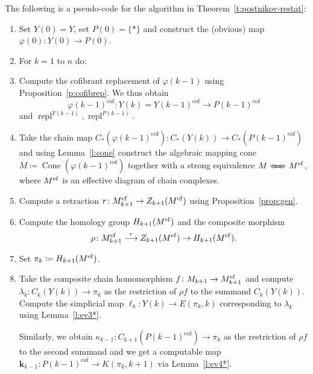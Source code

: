 \documentclass[12pt,a4wide]{article}
\theoremstyle{plain}
\theoremstyle{definition}
\newcommand{\cofr}{\mathrm{cof}}
\newcommand{\repl}{\mathop\mathrm{repl}}
\newcommand{\Pst}[1]{P(#1)}
\newcommand{\Yst}[1]{Y(#1)}
\newcommand{\towercompmap}[2]{#1(#2)}
\newcommand{\varphist}[1]{\towercompmap{\varphi}{#1}}
\newcommand{\thedim}{{n}}
\newcommand{\thedimm}{{k}}
\renewcommand\:{\colon}
\newcommand{\dY}{Y}
\newcommand{\dM}{M}
\newcommand{\dpi}{\pi}
\newcommand{\dK}{K}
\newcommand{\dE}{E}
\newcommand{\dC}{{C}}
\newcommand{\dZ}{Z}
\newcommand{\dH}{H}
\newcommand\kkk{{\mathbf{k}}}
\newcommand{\steq}{\Leftarrow\!\!\!\!\Leftarrow\!\!\!\!\Rightarrow\!\!\!\!\Rightarrow}
\DeclareMathOperator\dCone{{Cone}}
\begin{document}
The following is a pseudo-code for the algorithm in Theorem~\ref{t:postnikov-restat}:

\begin{enumerate}
[topsep=2pt,labelsep=1em,labelindent=0.5em,leftmargin=*,label=\textbf{(\arabic*)},align=left]
\item\label{bas:s} Set $\Yst{0} = \dY$, set $\Pst{0} = \{ * \}$  and construct the (obvious) map $\varphist{0}\: \Yst{0} \to\Pst{0}$.
\item For $\thedimm = 1$ to $\thedim$ do:
\item\label{iter:f} Compute the cofibrant replacement of $\varphist{\thedimm -1}$ using Proposition~\ref{p:cofibrep}. We thus obtain
\[
\varphist{\thedimm -1}^\cofr\: \Yst{\thedimm}  = \Yst{\thedimm -1} ^\cofr \longrightarrow \Pst{\thedimm -1}^\cofr
\]
and $\repl^{\Yst{\thedimm -1}}, \repl^{\Pst{\thedimm -1}}$.


\item\label{iter:s} Take the chain map $C_* (\varphist{\thedimm-1}^\cofr)\:\dC_*(\Yst{\thedimm})\to \dC_*(\Pst{\thedimm-1}^\cofr)$ and using Lemma~\ref{l:cone} construct the algebraic mapping cone $\dM\coloneqq\dCone(\varphist{\thedimm-1}^\cofr)$ together with a strong equivalence $\dM \steq \dM^\ef$, where $\dM^\ef$ is an effective diagram of chain complexes.
\item\label{step:retraction} Compute a retraction $r\: \dM^\ef _{\thedimm+1} \to \dZ_{\thedimm+1}  (\dM^\ef)$ using Proposition~\ref{prop:gen}. 
\item Compute the homology group $\dH_{\thedimm+1}(\dM^\ef)$ and the composite morphism \[\rho\:\dM^\ef _{\thedimm+1}\stackrel{r}{\longrightarrow}\dZ_{\thedimm+1}  (\dM^\ef) \to \dH_{\thedimm+1}(\dM^\ef).\]
\item Set $\dpi_\thedimm \coloneqq \dH_{\thedimm+1}(\dM^\ef)$.
\item Take the composite chain homomorphism $f\:{\dM}_{\thedimm+1} \to {\dM}_{\thedimm+1}^\ef$ and compute $\lambda_\thedimm\:\dC_\thedimm(\Yst{\thedimm})\to \dpi_\thedimm$ as the restriction of $\rho f$ to the summand $\dC_\thedimm(\Yst{\thedimm})$. Compute the simplicial map $\ell_\thedimm:\Yst{\thedimm} \to \dE(\dpi_\thedimm,\thedimm)$  corresponding to $\lambda_\thedimm$ using Lemma~\ref{l:ev3*}.

Similarly, we obtain $\kappa_{\thedimm-1} \: \dC_{\thedimm+1} ({\Pst{\thedimm-1}^\cofr})\to \dpi_{\thedimm}$ as the restriction  of $\rho f$ to the second summand and we get a computable map $\kkk_{\thedimm-1}\:\Pst{\thedimm-1}^\cofr \to \dK(\dpi_\thedimm,\thedimm+1)$ via Lemma~\ref{l:ev4*}.


\end{enumerate}
\end{document}
